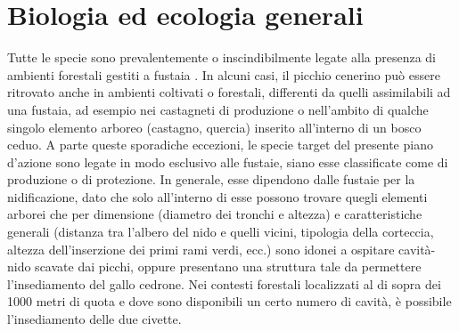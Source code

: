 \documentclass[10pt,twoside,openany,x11names,svgnames,italian,a5paper,dvipsnames,table]{memoir}
\begin{document}
\begin{table}[H]
\centering
{}
\end{table}


\section{Biologia ed ecologia generali}

Tutte le specie sono prevalentemente o inscindibilmente legate alla presenza di ambienti forestali gestiti a fustaia \cite{Brichetti04} \cite{Pedrini05} \cite{Angeli07}. In alcuni casi, il picchio cenerino può essere ritrovato anche in ambienti coltivati o forestali, differenti da quelli assimilabili ad una fustaia, ad esempio nei castagneti di produzione o nell’ambito di qualche singolo elemento arboreo (castagno, quercia) inserito all’interno di un bosco ceduo. A parte queste sporadiche eccezioni, le specie target del presente piano d’azione sono legate in modo esclusivo alle fustaie, siano esse classificate come di produzione o di protezione. In generale, esse dipendono dalle fustaie per la nidificazione, dato che solo all’interno di esse possono trovare quegli elementi arborei che per dimensione (diametro dei tronchi e altezza) e caratteristiche generali (distanza tra l’albero del nido e quelli vicini, tipologia della corteccia, altezza dell’inserzione dei primi rami verdi, ecc.) sono idonei a ospitare cavità-nido scavate dai picchi, oppure presentano una struttura tale da permettere l’insediamento del gallo cedrone. Nei contesti forestali localizzati al di sopra dei 1000 metri di quota e dove sono disponibili un certo numero di cavità, è possibile l’insediamento delle due civette.
\end{document}
